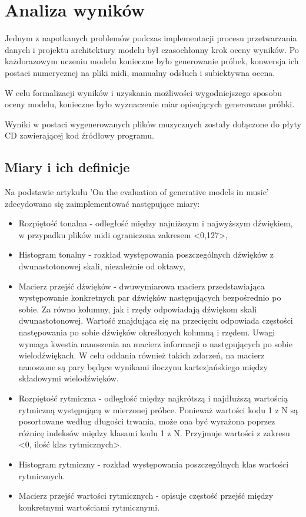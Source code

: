 \chapter{Analiza wyników}\label{chap:results}
{

    Jednym z napotkanych problemów podczas implementacji procesu przetwarzania danych i projektu architektury modelu
    był czasochłonny krok oceny wyników. Po każdorazowym uczeniu modelu konieczne było generowanie próbek, 
    konwersja ich postaci numerycznej na pliki midi, manualny odsłuch i subiektywna ocena.

    W celu formalizacji wyników i uzyskania możliwości wygodniejszego sposobu oceny modelu, konieczne było wyznaczenie
    miar opisujących generowane próbki. 

    Wyniki w postaci wygenerowanych plików muzycznych zostały dołączone do płyty CD zawierającej kod źródłowy programu.

    \section{Miary i ich definicje}\label{sec:measuremnts}
    {
        Na podstawie artykułu 'On the evaluation of generative models in music'\cite{Yang2018OnTE} zdecydowano się zaimplementować następujące miary:
        \begin{itemize}
            \setlength\itemsep{-0.5em}
            \item Rozpiętość tonalna - odległość między najniższym i najwyższym dźwiękiem, w przypadku plików midi ograniczona
            zakresem <0,127>,
            \item Histogram tonalny - rozkład występowania poszczególnych dźwięków z dwunastotonowej skali, niezależnie od oktawy, 
            \item Macierz przejść dźwięków - dwuwymiarowa macierz przedstawiająca występowanie konkretnych par dźwięków następujących
            bezpośrednio po sobie. Za równo kolumny, jak i rzędy odpowiadają dźwiękom skali dwunastotonowej. 
            Wartość znajdująca się na przecięciu odpowiada częstości następowania po sobie dźwięków określonych kolumną i rzędem. 
            Uwagi wymaga kwestia nanoszenia na macierz informacji o następujących po sobie wielodźwiękach. W celu oddania
            również takich zdarzeń, na macierz nanoszone są pary będące wynikami iloczynu kartezjańskiego między składowymi wielodźwięków.
            \item Rozpiętość rytmiczna - odległość między najkrótszą i najdłuższą wartością rytmiczną występującą w mierzonej próbce. 
            Ponieważ wartości kodu  1\,\,z\,\,N są posortowane według długości trwania, może ona być wyrażona poprzez różnicę indeksów 
            między klasami kodu  1\,\,z\,\,N. Przyjmuje wartości z zakresu <0, ilość klas rytmicznych>.
            \item Histogram rytmiczny - rozkład występowania poszczególnych klas wartości rytmicznych.
            \item Macierz przejść wartości rytmicznych - opisuje częstość przejść między konkretnymi wartościami rytmicznymi.
        \end{itemize}

}}
